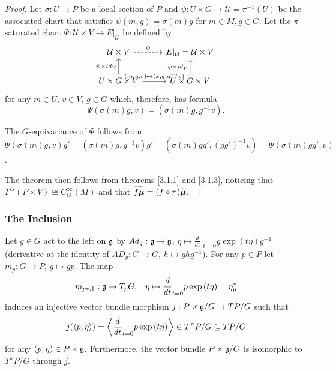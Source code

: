 \begin{proof}
Let $\sigma: U \to P$ be a local section of $P$ and $\psi: U \times G \to \mathcal U = \pi^{-1}(U)$ be the associated chart that satisfies $\psi(m, g) = \sigma(m)g$ for $m \in M, g \in G$. Let the $\pi$-saturated chart $\Psi: \mathcal U \times V \to E|_{\mathcal U}$ be defined by
\begin{equation*}
    \begin{tikzcd}
        \mathcal U \times V \arrow[dashed]{r}{\Psi} & E|_{\mathcal U} = \mathcal U \times V \\
        U \times G \times V \arrow{u}{\psi \times id_V} \arrow{r}{(m, g, v) \mapsto (x, g, g^{-1}v)}    & U \times G \times V \arrow{u}{\psi \times id_V}
    \end{tikzcd}
\end{equation*}
for any $m \in U$, $v \in V$, $g \in G$ which, therefore, has formula
\[
    \Psi(\sigma(m)g, v) = (\sigma(m)g, g^{-1}v).
\]

The $G$-equivariance of $\Psi$ follows from $\Psi(\sigma(m)g, v)g' = (\sigma(m)g, g^{-1}v)g' = (\sigma(m)gg', (gg')^{-1}v) = \Psi(\sigma(m)gg', v)$.

The theorem then follows from theorems \ref{3.1.1} and \ref{3.1.3}, noticing that $\Gamma^G(P \times V) \cong C^\infty_G(M)$ and that $\widetilde{f \bm{\mu}} = (f \circ \pi) \widetilde{\bm{\mu}}$.
\end{proof}

\subsubsection{The Inclusion}

\begin{theorem}
Let $g \in G$ act to the left on $\mathfrak{g}$ by $Ad_g: \mathfrak{g} \to \mathfrak{g}$, $\eta \mapsto \frac{d}{dt}|_{t=0} g \exp{(t \eta)} g^{-1}$ (derivative at the identity of $AD_g: G \to G$, $h \mapsto g h g^{-1}$). For any $p \in P$ let $m_p: G \to P$, $g \mapsto gp$. The map 
    \begin{align}
        m_{p*, 1}: \mathfrak{g} \to T_p G,& &\eta \mapsto \frac{d}{dt}_{t = 0}p \exp{(t \eta)} = \eta^*_p
    \end{align}
    induces an injective vector bundle morphism $j: P \times \mathfrak{g} / G \to TP/G$ such that 
    \begin{align}\label{formulaJ}
        j(\left\langle p, \mathfrak{\eta} \right\rangle) = \left\langle \frac{d}{dt}_{t = 0} p \exp{(t \mathfrak{\eta})} \right\rangle \in T^\pi P/G \subseteq TP/G
    \end{align} for any $(p, \mathfrak{\eta}) \in P \times \mathfrak{g}$. Furthermore, the vector bundle $P \times \mathfrak{g}/G$ is isomorphic to $T^\pi P/G$ through $j$.
\end{theorem}

